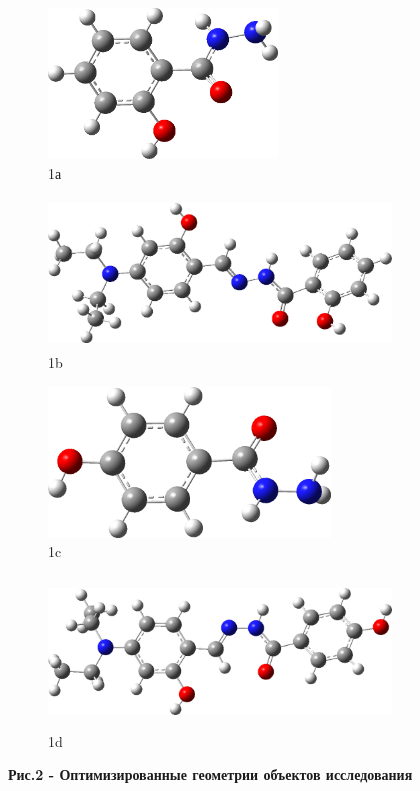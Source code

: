 \begin{figure}[H]
    \centering
    \begin{subfigure}[t]{0.35\textwidth}
        \centering
        \includegraphics[width=\textwidth, height=4cm]{media/chem2/image31}
        \caption*{1а}
    \end{subfigure}
    \hfill
    \begin{subfigure}[t]{0.55\textwidth}
        \centering
        \includegraphics[width=\textwidth, height=4cm]{media/chem2/image32}
        \caption*{1b}
    \end{subfigure}
    
    \begin{subfigure}[t]{0.35\textwidth}
        \centering
        \includegraphics[width=\textwidth, height=4cm]{media/chem2/image33}
        \caption*{1c}
    \end{subfigure}
    \hfill
    \begin{subfigure}[t]{0.55\textwidth}
        \centering
        \includegraphics[width=\textwidth, height=4cm]{media/chem2/image34}
        \caption*{1d}
    \end{subfigure}
    \caption*{{\bfseries Рис.2 - Оптимизированные геометрии объектов исследования}}
\end{figure}

